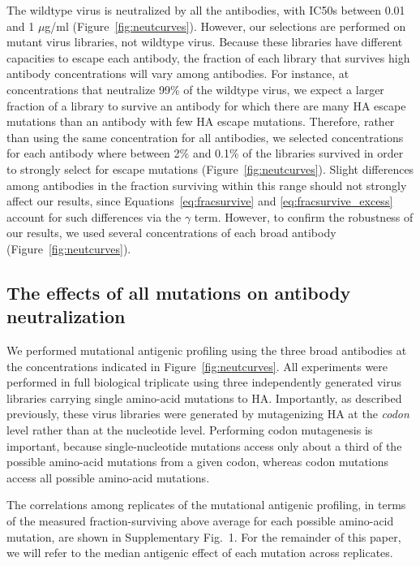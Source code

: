 \documentclass[11pt]{article}
\begin{document}
The wildtype virus is neutralized by all the antibodies, with IC50s between 0.01 and 1 $\mu$g/ml (Figure~\ref{fig:neutcurves}).
However, our selections are performed on mutant virus libraries, not wildtype virus.
Because these libraries have different capacities to escape each antibody, the fraction of each library that survives high antibody concentrations will vary among antibodies.
For instance, at concentrations that neutralize 99\% of the wildtype virus, we expect a larger fraction of a library to survive an antibody for which there are many HA escape mutations than an antibody with few HA escape mutations.
Therefore, rather than using the same concentration for all antibodies, we selected concentrations for each antibody where between 2\% and 0.1\% of the libraries survived in order to strongly select for escape mutations (Figure~\ref{fig:neutcurves}).
Slight differences among antibodies in the fraction surviving within this range should not strongly affect our results, since Equations~\ref{eq:fracsurvive} and \ref{eq:fracsurvive_excess} account for such differences via the $\gamma$ term.
However, to confirm the robustness of our results, we used several concentrations of each broad antibody (Figure~\ref{fig:neutcurves}).

\subsection*{The effects of all mutations on antibody neutralization}
We performed mutational antigenic profiling using the three broad antibodies at the concentrations indicated in Figure~\ref{fig:neutcurves}. 
All experiments were performed in full biological triplicate using three independently generated virus libraries carrying single amino-acid mutations to HA\cite{doud2016accurate}.
Importantly, as described previously\cite{doud2016accurate}, these virus libraries were generated by mutagenizing HA at the \emph{codon} level rather than at the nucleotide level.
Performing codon mutagenesis is important, because single-nucleotide mutations access only about a third of the possible amino-acid mutations from a given codon, whereas codon mutations access all possible amino-acid mutations.

The correlations among replicates of the mutational antigenic profiling, in terms of the measured fraction-surviving above average for each possible amino-acid mutation, are shown in Supplementary Fig.~1.
For the remainder of this paper, we will refer to the median antigenic effect of each mutation across replicates.
\end{document}
